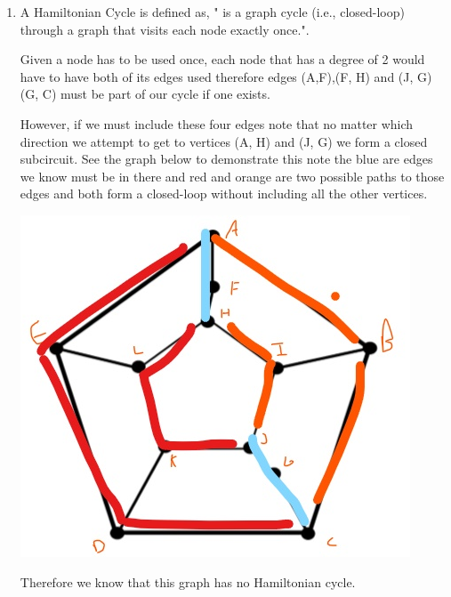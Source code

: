 \documentclass{article}
\begin{document}
\begin{enumerate}
\begin{enumerate}
        \item A Hamiltonian Cycle is defined as, " is a graph cycle (i.e., closed-loop) through a graph that visits each node exactly once.".
 
        Given a node has to be used once, each node that has a degree of 2 would have to have both of its edges used therefore edges (A,F),(F, H) and (J, G)(G, C) must be part of our cycle if one exists. 
        
        However, if we must include these four edges note that no matter which direction we attempt to get to vertices (A, H) and (J, G) we form a closed subcircuit. 
        See the graph below to demonstrate this note the blue are edges we know must be in there and red and orange are two possible paths to those edges and both form a closed-loop without including all the other vertices.

        \includegraphics[scale=0.3]{1_Graph2.jpg}

        Therefore we know that this graph has no Hamiltonian cycle.


\end{enumerate}
\end{enumerate}
\end{document}
